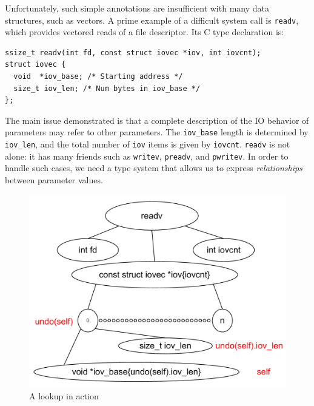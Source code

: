 Unfortunately, such simple annotations are insufficient with many data
structures, such as vectors. A prime example of a difficult system
call is \texttt{readv}, which provides vectored reads of a file
descriptor. Its C type declaration is:
\begin{lstlisting}
ssize_t readv(int fd, const struct iovec *iov, int iovcnt);
struct iovec {
  void  *iov_base; /* Starting address */
  size_t iov_len; /* Num bytes in iov_base */
};
\end{lstlisting}
The main issue demonstrated is that a complete description of the IO behavior of
parameters may refer to other parameters.  The {\tt iov\_base} length
is determined by {\tt iov\_len}, and the total number of {\tt iov}
items is given by {\tt iovcnt}.  \texttt{readv} is not alone: it has
many friends such as \texttt{writev}, \texttt{preadv}, and
\texttt{pwritev}. In order to handle such cases, we need a type system
that allows us to express \emph{relationships} between parameter values.



\begin{figure}
\includegraphics[scale=0.3]{tachyon/LookupDiagram.pdf}
\caption{A lookup in action}
\label{tach:fig:lookup}
\end{figure}


